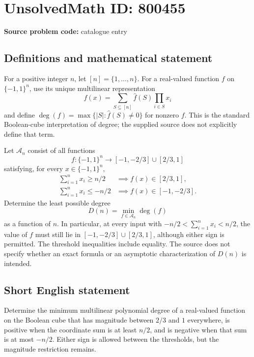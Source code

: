 \documentclass[11pt]{article}
\begin{document}
\section*{UnsolvedMath ID: 800455}
\textbf{Source problem code:} catalogue entry
\subsection{Definitions and mathematical statement}
For a positive integer \(n\), let \([n]=\{1,\ldots,n\}\). For a real-valued function \(f\) on \(\{-1,1\}^n\), use its unique multilinear representation
\[
f(x)=\sum_{S\subseteq[n]}\widehat f(S)\prod_{i\in S}x_i
\]
and define \(\deg(f)=\max\{|S|:\widehat f(S)\ne0\}\) for nonzero \(f\). This is the standard Boolean-cube interpretation of degree; the supplied source does not explicitly define that term.

Let \(\mathcal A_n\) consist of all functions
\[
f:\{-1,1\}^n\longrightarrow[-1,-2/3]\cup[2/3,1]
\]
satisfying, for every \(x\in\{-1,1\}^n\),
\[
\begin{aligned}
\sum_{i=1}^n x_i\ge n/2&\implies f(x)\in[2/3,1],\\
\sum_{i=1}^n x_i\le -n/2&\implies f(x)\in[-1,-2/3].
\end{aligned}
\]
Determine the least possible degree
\[
D(n)=\min_{f\in\mathcal A_n}\deg(f)
\]
as a function of \(n\). In particular, at every input with \(-n/2<\sum_{i=1}^n x_i<n/2\), the value of \(f\) must still lie in \([-1,-2/3]\cup[2/3,1]\), although either sign is permitted. The threshold inequalities include equality. The source does not specify whether an exact formula or an asymptotic characterization of \(D(n)\) is intended.
\subsection{Short English statement}
Determine the minimum multilinear polynomial degree of a real-valued function on the Boolean cube that has magnitude between \(2/3\) and \(1\) everywhere, is positive when the coordinate sum is at least \(n/2\), and is negative when that sum is at most \(-n/2\). Either sign is allowed between the thresholds, but the magnitude restriction remains.
\end{document}
